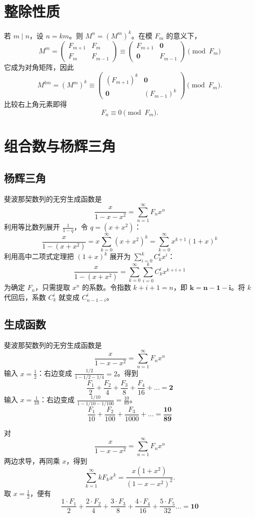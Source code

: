 \section{整除性质}
若 \(m\mid n\)，设 \(n=km\)。则 \(M^n=(M^m)^k\)。在模 \(F_m\) 的意义下，
$$ M^m = \begin{pmatrix} F_{m+1} & F_m \\ F_m & F_{m-1} \end{pmatrix} \equiv \begin{pmatrix} F_{m+1} & \mathbf{0} \\ \mathbf{0} & F_{m-1} \end{pmatrix} \pmod{F_m} $$
它成为对角矩阵，因此
\[
M^{km} = (M^m)^k \equiv \begin{pmatrix} (F_{m+1})^k & \mathbf{0} \\ \mathbf{0} & (F_{m-1})^k \end{pmatrix} \pmod{F_m}.
\]
比较右上角元素即得
\[
F_n \equiv 0 \pmod{F_m}.
\]

\section{组合数与杨辉三角}
\subsection{杨辉三角}
斐波那契数列的无穷生成函数是 \[\frac{x}{1-x-x^2} = \sum_{n=1}^{\infty} F_n x^n\]
利用等比数列展开 $\frac{1}{1-q}$，令 $q = (x+x^2)$：
$$ \frac{x}{1 - (x + x^2)} = x \sum_{k=0}^{\infty} (x + x^2)^k = \sum_{k=0}^{\infty} x^{k+1} (1 + x)^k $$
利用高中二项式定理把 $(1+x)^k$ 展开为 $\sum_{i=0}^k C_k^i x^i$：
$$\frac{x}{1 - (x + x^2)}  = \sum_{k=0}^{\infty} \sum_{i=0}^k C_k^i x^{k+i+1} $$
为确定 $F_n$，只需提取 $x^n$ 的系数。令指数 $k+i+1 = n$，即 $\mathbf{k = n-1-i}$。将 $k$ 代回后，系数 $C_k^i$ 就变成 $C_{n-1-i}^i$。

\subsection{生成函数}
斐波那契数列的无穷生成函数是 \[\frac{x}{1-x-x^2} = \sum_{n=1}^{\infty} F_n x^n\]
输入 $x = \frac{1}{2}$：右边变成 $\frac{1/2}{1 - 1/2 - 1/4} = 2$。得到
\[ \frac{F_1}{2} + \frac{F_2}{4} + \frac{F_3}{8} + \frac{F_4}{16} + \dots = \mathbf{2}\] 
输入 $x = \frac{1}{10}$：右边变成 $\frac{1/10}{1 - 1/10 - 1/100} = \frac{10}{89}$。\[\frac{F_1}{10} + \frac{F_2}{100} + \frac{F_3}{1000} + \dots = \mathbf{\frac{10}{89}} \]

对
\[
\frac{x}{1-x-x^2} = \sum_{n=1}^{\infty} F_n x^n
\]
两边求导，再同乘 \(x\)，得到
\[
\sum_{k=1}^\infty kF_kx^k = \frac{x(1+x^2)}{(1-x-x^2)^2}.
\]
取 \(x=\frac12\)，便有
$$  \frac{1 \cdot F_1}{2} + \frac{2 \cdot F_2}{4} + \frac{3 \cdot F_3}{8} + \frac{4 \cdot F_4}{16} + \frac{5 \cdot F_5}{32} \dots = \mathbf{10}  $$


